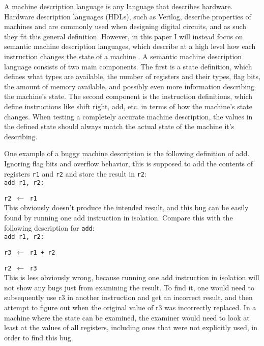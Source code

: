 \documentclass[letterpaper,12pt]{article}
\begin{document}
A machine description language is any language that describes hardware. Hardware description languages (HDLs), such as Verilog, describe properties of machines and are commonly used when designing digital circuits, and as such they fit this general definition. However, in this paper I will instead focus on semantic machine description languages, which describe at a high level how each instruction changes the state of a machine \cite{Design}. A semantic machine description language consists of two main components. The first is a state definition, which defines what types are available, the number of registers and their types, flag bits, the amount of memory available, and possibly even more information describing the machine's state. The second component is the instruction definitions, which define instructions like shift right, add, etc. in terms of how the machine's state changes. When testing a completely accurate machine description, the values in the defined state should always match the actual state of the machine it's describing.

One example of a buggy machine description is the following definition of add. Ignoring flag bits and overflow behavior, this is supposed to add the contents of registers \texttt{r1} and \texttt{r2} and store the result in \texttt{r2}:\\

\texttt{add r1, r2:}

\texttt{r2 $\leftarrow$ r1}\\

This obviously doesn't produce the intended result, and this bug can be easily found by running one add instruction in isolation. Compare this with the following description for \texttt{add}:\\

\texttt{add r1, r2:}

\texttt{r3 $\leftarrow$ r1 + r2}

\texttt{r2 $\leftarrow$ r3}\\

This is less obviously wrong, because running one add instruction in isolation will not show any bugs just from examining the result. To find it, one would need to subsequently use r3 in another instruction and get an incorrect result, and then attempt to figure out when the original value of r3 was incorrectly replaced. In a machine where the state can be examined, the examiner would need to look at least at the values of all registers, including ones that were not explicitly used, in order to find this bug.
\end{document}
